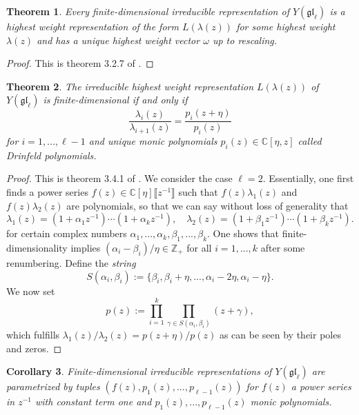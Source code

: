 \documentclass[11pt]{report}
\newtheorem{theorem}{Theorem}[section]
\newtheorem{corollary}[theorem]{Corollary}
\theoremstyle{definition}
\theoremstyle{remark}
\theoremstyle{remark}
\newcommand{\Z}{\mathbb{Z}}
\newcommand{\C}{\mathbb{C}}
\begin{document}
\begin{theorem}
Every finite-dimensional irreducible representation of $Y(\mathfrak{gl}_\ell)$ is a highest weight representation of the form $L(\lambda(z))$ for some highest weight $\lambda(z)$ and has a unique highest weight vector $\omega$ up to rescaling.
\end{theorem}

\begin{proof}
This is theorem 3.2.7 of \cite{book:molev}.
\end{proof}

\begin{theorem}
The irreducible highest weight representation $L(\lambda(z))$ of $Y(\mathfrak{gl}_\ell)$ is finite-dimensional if and only if
\begin{equation*}
\frac{\lambda_i(z)}{\lambda_{i+1}(z)} = \frac{p_i(z+\eta)}{p_i(z)}
\end{equation*}
for $i=1,...,\ell-1$ and unique monic polynomials $p_i(z) \in \C[\eta,z]$ called \emph{Drinfeld polynomials}.
\end{theorem}

\begin{proof}
This is theorem 3.4.1 of \cite{book:molev}. We consider the case $\ell = 2$. Essentially, one first finds a power series $f(z) \in \C[\eta]\llbracket z^{-1} \rrbracket$ such that $f(z) \lambda_1(z)$ and $f(z) \lambda_2(z)$ are polynomials, so that we can say without loss of generality that
\begin{equation*}
\lambda_1(z) = (1+\alpha_1 z^{-1}) \cdots (1+\alpha_k z^{-1}), \quad \lambda_2(z) = (1+\beta_1 z^{-1}) \cdots (1+\beta_k z^{-1}).
\end{equation*}
for certain complex numbers $\alpha_1,...,\alpha_k,\beta_1,...,\beta_k$. One shows that finite-dimensionality implies $(\alpha_i - \beta_i)/\eta \in \Z_+$ for all $i=1,...,k$ after some renumbering. Define the \emph{string}
\begin{equation*}
S(\alpha_i,\beta_i) := \{ \beta_i, \beta_i+\eta, ..., \alpha_i-2\eta, \alpha_i-\eta \}.
\end{equation*}
We now set
\begin{equation*}
p(z) := \prod_{i=1}^k \prod_{\gamma \in S(\alpha_i,\beta_i)} (z + \gamma),
\end{equation*}
which fulfills $\lambda_1(z) / \lambda_2(z) = p(z+\eta) / p(z)$ as can be seen by their poles and zeros.
\end{proof}

\begin{corollary}
Finite-dimensional irreducible representations of $Y(\mathfrak{gl}_\ell)$ are parametrized by tuples $(f(z),p_1(z),...,p_{\ell-1}(z))$ for $f(z)$ a power series in $z^{-1}$ with constant term one and $p_1(z),...,p_{\ell-1}(z)$ monic polynomials.
\end{corollary}
\end{document}
